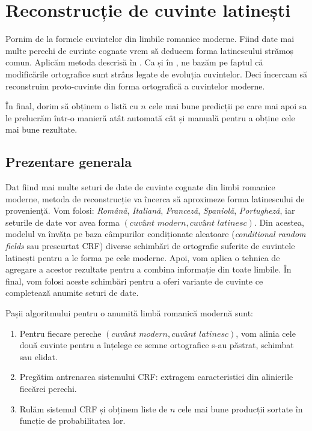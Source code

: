 \chapter{Reconstrucție de cuvinte latinești}
\label{chap:two}
Pornim de la formele cuvintelor din limbile romanice moderne. Fiind date mai multe perechi de cuvinte
cognate vrem să deducem forma latinescului strămoș comun. Aplicăm metoda descrisă în \cite{sub}. 
Ca și în \cite{theone}, ne bazăm pe faptul că modificările ortografice sunt strâns legate de 
evoluția cuvintelor. Deci încercam să reconstruim proto-cuvinte din forma ortografică a cuvintelor 
moderne.

În final, dorim să obținem o listă cu $n$ cele mai bune predicții pe care mai apoi sa le prelucrăm
într-o manieră atât automată cât și manuală pentru a obține cele mai bune rezultate.

\section{Prezentare generala}
Dat fiind mai multe seturi de date de cuvinte cognate din limbi romanice moderne, metoda de 
reconstrucție va încerca să aproximeze forma latinescului de proveniență. Vom folosi: \textit{Română},
\textit{Italiană}, \textit{Franceză}, \textit{Spaniolă}, \textit{Portugheză}, iar seturile de date
vor avea forma $(\textit{cuvânt modern}, \textit{cuvânt latinesc})$. Din acestea, modelul va învăța 
pe baza câmpurilor condiționate aleatoare (\textit{conditional random fields} sau prescurtat CRF) 
diverse schimbări de ortografie suferite de cuvintele latinești pentru a le forma pe cele moderne. 
Apoi, vom aplica o tehnica de agregare a acestor rezultate pentru a combina informație din toate 
limbile. În final, vom folosi aceste schimbări pentru a oferi variante de cuvinte ce 
completează anumite seturi de date.

Pașii algoritmului pentru o anumită limbă romanică modernă sunt:

\begin{enumerate}
  \item Pentru fiecare pereche $(\textit{cuvânt modern}, \textit{cuvânt latinesc})$, vom alinia
    cele două cuvinte pentru a înțelege ce semne ortografice s-au păstrat, schimbat sau elidat.
  \item Pregătim antrenarea sistemului CRF: extragem caracteristici din alinierile fiecărei perechi.
  \item Rulăm sistemul CRF și obținem liste de $n$ cele mai bune producții sortate în funcție de
    probabilitatea lor.
\end{enumerate}

